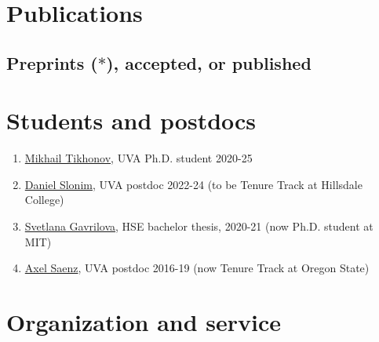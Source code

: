 \documentclass[letterpaper,11pt]{article}
\begin{document}
\begin{itemize}
\end{itemize}

\section*{Publications}

\subsection*{Preprints ($*$), accepted, or published}



\section*{Students and postdocs}

\begin{enumerate}
    \item \href{https://mtikhonov.com}{Mikhail Tikhonov}, UVA Ph.D. student 2020-25
    \item \href{https://danielslonim.github.io}{Daniel Slonim}, UVA postdoc 2022-24 (to be Tenure Track at Hillsdale College)
    \item \href{https://math.mit.edu/directory/profile.html?pid=2588}{Svetlana Gavrilova},  HSE bachelor thesis, 2020-21 (now Ph.D. student at MIT)
    \item \href{https://sites.google.com/view/axelsaenz}{Axel Saenz}, UVA postdoc 2016-19 (now Tenure Track at Oregon State)
\end{enumerate}

\section*{Organization and service}
\end{document}
